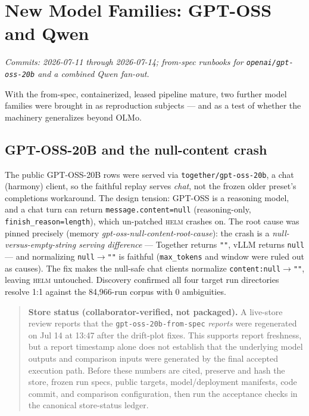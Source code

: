 \documentclass[11pt]{report}
\newcommand{\code}[1]{\texttt{#1}}
\newcommand{\evidencebox}[2]{\begin{quote}\noindent\textbf{#1.} #2\end{quote}}
\begin{document}
\chapter{New Model Families: GPT-OSS and Qwen}
\label{chap:newmodels}

\emph{Commits: 2026-07-11 through 2026-07-14; from-spec runbooks for
\code{openai/gpt-oss-20b} and a combined Qwen fan-out.}

With the from-spec, containerized, leased pipeline mature, two further model
families were brought in as reproduction subjects --- and as a test of whether the
machinery generalizes beyond OLMo.

\section{GPT-OSS-20B and the null-content crash}

The public GPT-OSS-20B rows were served via \code{together/gpt-oss-20b}, a chat
(harmony) client, so the faithful replay serves \emph{chat}, not the frozen older
preset's completions workaround. The design tension: GPT-OSS is a reasoning model,
and a chat turn can return \code{message.content=null} (reasoning-only,
\code{finish\_reason=length}), which un-patched \textsc{helm} crashes on. The root
cause was pinned precisely (memory \emph{gpt-oss-null-content-root-cause}): the
crash is a \emph{null-versus-empty-string serving difference} --- Together returns
\code{""}, vLLM returns \code{null} --- and normalizing
\code{null}$\rightarrow$\code{""} is faithful (\code{max\_tokens} and window were
ruled out as causes). The fix makes the null-safe chat clients normalize
\code{content:null}$\rightarrow$\code{""}, leaving \textsc{helm} untouched.
Discovery confirmed all four target run directories resolve 1:1 against the
84{,}966-run corpus with 0 ambiguities.

\evidencebox{Store status (collaborator-verified, not packaged)}{A live-store
review reports that the \code{gpt-oss-20b-from-spec} \emph{reports} were regenerated
on Jul 14 at 13:47 after the drift-plot fixes. This supports report freshness, but a
report timestamp alone does not establish that the underlying model outputs and
comparison inputs were generated by the final accepted execution path. Before these
numbers are cited, preserve and hash the store, frozen run specs, public targets,
model/deployment manifests, code commit, and comparison configuration, then run the
acceptance checks in the canonical store-status ledger.}
\end{document}
